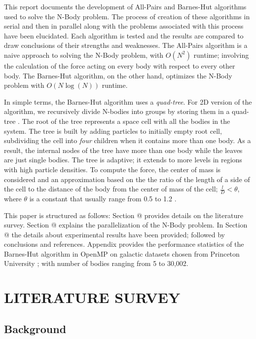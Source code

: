 \documentclass[letterpaper, 10 pt, conference]{ieeeconf}
\makeatletter
\newcommand{\Rom}[1]{\expandafter\@slowromancap\romannumeral #1@}
\makeatother
\begin{document}
This report documents the development of All-Pairs and Barnes-Hut algorithms used to solve the N-Body problem. The process of creation of these algorithms in serial and then in parallel along with the problems associated with this process have been elucidated. Each algorithm is tested and the results are compared to draw conclusions of their strengths and weaknesses. The All-Pairs algorithm is a naive approach to solving the N-Body problem, with \(O(N^2)\) runtime; involving the calculation of the force acting on every body with respect to every other body. The Barnes-Hut algorithm, on the other hand, optimizes the N-Body problem with \(O(N\log(N))\) runtime.\par

In simple terms, the Barnes-Hut algorithm uses a \textit{quad-tree}. For 2D version of the algorithm, we recursively divide N-bodies into groups by storing them in a quad-tree \cite{c3}. The root of the tree represents a space cell with all the bodies in the system. The tree is built by adding particles to initially empty root cell, subdividing the cell into \textit{four} children when it contains more than one body. As a result, the internal nodes of the tree have more than one body while the leaves are just single bodies. The tree is adaptive; it extends to more levels in regions with high particle densities. To compute the force, the center of mass is considered and an approximation based on the the ratio of the length of a side of the cell to the distance of the body from the center of mass of the cell; \(\frac{l}{D} < \theta\), where \(\theta\) is a constant that usually range from 0.5 to 1.2 \cite{c3}.\par

This paper is structured as follows: Section \Rom{2} provides details on the literature survey. Section \Rom{3} explains the parallelization of the N-Body problem. In Section \Rom{4} the details about experimental results have been provided; followed by conclusions and references. Appendix provides the performance statistics of the Barnes-Hut algorithm in OpenMP on galactic datasets chosen from Princeton University \cite{c4}; with number of bodies ranging from 5 to 30,002.

\section{LITERATURE SURVEY}

\subsection{Background}
\end{document}
